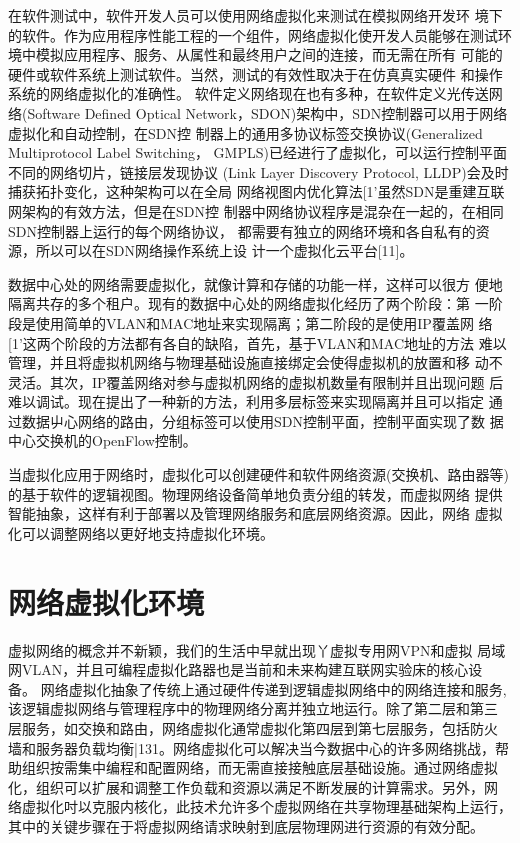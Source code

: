 在软件测试中，软件开发人员可以使用网络虚拟化来测试在模拟网络开发环 境下的软件。作为应用程序性能工程的一个组件，网络虚拟化使开发人员能够在测试环境中模拟应用程序、服务、从属性和最终用户之间的连接，而无需在所有 可能的硬件或软件系统上测试软件。当然，测试的有效性取决于在仿真真实硬件 和操作系统的网络虚拟化的准确性。
软件定义网络现在也有多种，在软件定义光传送网络(Software Defined Optical Network，SDON)架构中，SDN控制器可以用于网络虚拟化和自动控制，在SDN控 制器上的通用多协议标签交换协议(Generalized Multiprotocol Label Switching， GMPLS)已经进行了虚拟化，可以运行控制平面不同的网络切片，链接层发现协议 (Link Layer Discovery Protocol, LLDP)会及时捕获拓扑变化，这种架构可以在全局 网络视图内优化算法[1'虽然SDN是重建互联网架构的有效方法，但是在SDN控 制器中网络协议程序是混杂在一起的，在相同SDN控制器上运行的每个网络协议， 都需要有独立的网络环境和各自私有的资源，所以可以在SDN网络操作系统上设 计一个虚拟化云平台[11]。

数据中心处的网络需要虚拟化，就像计算和存储的功能一样，这样可以很方 便地隔离共存的多个租户。现有的数据中心处的网络虚拟化经历了两个阶段：第 一阶段是使用简单的VLAN和MAC地址来实现隔离；第二阶段的是使用IP覆盖网 络[1'这两个阶段的方法都有各自的缺陷，首先，基于VLAN和MAC地址的方法 难以管理，并且将虚拟机网络与物理基础设施直接绑定会使得虚拟机的放置和移 动不灵活。其次，IP覆盖网络对参与虚拟机网络的虚拟机数量有限制并且出现问题 后难以调试。现在提出了一种新的方法，利用多层标签来实现隔离并且可以指定 通过数据屮心网络的路由，分组标签可以使用SDN控制平面，控制平面实现了数 据中心交换机的OpenFlow控制。


当虚拟化应用于网络时，虚拟化可以创建硬件和软件网络资源(交换机、路由器等)的基于软件的逻辑视图。物理网络设备简单地负责分组的转发，而虚拟网络 提供智能抽象，这样有利于部署以及管理网络服务和底层网络资源。因此，网络 虚拟化可以调整网络以更好地支持虚拟化环境。


\section{网络虚拟化环境}
虚拟网络的概念并不新颖，我们的生活中早就出现丫虚拟专用网VPN和虚拟 局域网VLAN，并且可编程虚拟化路器也是当前和未来构建互联网实验床的核心设 备。
网络虚拟化抽象了传统上通过硬件传递到逻辑虚拟网络中的网络连接和服务, 该逻辑虚拟网络与管理程序中的物理网络分离并独立地运行。除了第二层和第三 层服务，如交换和路由，网络虚拟化通常虚拟化第四层到第七层服务，包括防火 墙和服务器负载均衡|131。网络虚拟化可以解决当今数据中心的许多网络挑战，帮 助组织按需集中编程和配置网络，而无需直接接触底层基础设施。通过网络虚拟 化，组织可以扩展和调整工作负载和资源以满足不断发展的计算需求。另外，网 络虚拟化吋以克服内核化，此技术允许多个虚拟网络在共享物理基础架构上运行， 其中的关键步骤在于将虚拟网络请求映射到底层物理网进行资源的有效分配。

